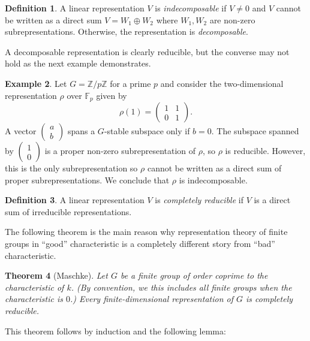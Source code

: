 \documentclass[12pt]{article}
\theoremstyle{plain}
\newtheorem{theorem}{Theorem}[section]
\theoremstyle{definition}
\newtheorem{definition}[theorem]{Definition}
\newtheorem{example}[theorem]{Example}
\theoremstyle{remark}
\numberwithin{equation}{section}
\begin{document}
\begin{definition}
A linear representation $V$ is \emph{indecomposable} if $V \ne 0$ and
$V$ cannot be written as a direct sum $V = W_1 \oplus W_2$ where
$W_1, W_2$ are non-zero subrepresentations.
Otherwise, the representation is \emph{decomposable}.
\end{definition}

A decomposable representation is clearly reducible, but the converse may
not hold as the next example demonstrates.

\begin{example}
Let $G=\mathbb{Z}/p\mathbb{Z}$ for a prime $p$
and consider the two-dimensional representation $\rho$ over $\mathbb{F}_p$
given by
\[
\rho(1) = \begin{pmatrix} 1&1\\0&1 \end{pmatrix} .
\]
A vector $\begin{pmatrix} a\\b \end{pmatrix} $ spans a
$G$-stable subspace only if $b=0$.
The subspace spanned by $\begin{pmatrix} 1\\0 \end{pmatrix}$
is a proper non-zero subrepresentation
of $\rho$, so $\rho$ is reducible.
However, this is the only subrepresentation so $\rho$
cannot be written as a direct sum of proper subrepresentations.
We conclude that $\rho$ is indecomposable.
\end{example}

\begin{definition}
A linear representation $V$ is \emph{completely reducible}
if $V$ is a direct sum of irreducible representations.
\end{definition}

The following theorem is the main reason why representation theory of finite
groups in ``good'' characteristic is a completely different story from
``bad'' characteristic.

\begin{theorem}[Maschke]
Let $G$ be a finite group of order coprime to the characteristic of $k$.
(By convention, we this includes all finite groups when the
characteristic is $0$.)
Every finite-dimensional representation of $G$ is completely reducible.
\end{theorem}

This theorem follows by induction and the following lemma:
\end{document}
